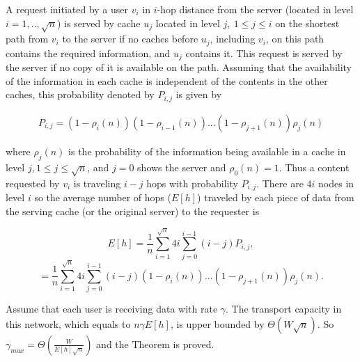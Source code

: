 \documentclass[journal]{IEEEtran}
\theoremstyle{plain}
\theoremstyle{remark}
\begin{document}
\begin{IEEEproof}
A request initiated by a user $v_i$ in $i$-hop distance from the server (located in level $i=1,..,\sqrt{n}$) is served by cache $u_j$ located in level $j,\ 1\leq j\leq i$ on the shortest path from $v_i$ to the server if no caches before $u_j$, including $v_i$, on this path contains the required information, and $u_j$ contains it. This request is served by the server if no copy of it is available on the path. Assuming that the availability of the information in each cache is independent of the contents in the other caches, this probability denoted by $P_{i,j}$ is given by

\begin{eqnarray}
P_{i,j}=(1-\rho_i(n))(1-\rho_{i-1}(n))...(1-\rho_{j+1}(n))\rho_j(n)
\end{eqnarray}

where $\rho_j(n)$ is the probability of the information being available in a cache in level $j, 1 \leq j \leq \sqrt{n}$, and $j=0$ shows the server and $\rho_0(n)=1$. Thus a content requested by $v_i$ is traveling $i-j$ hops with probability $P_{i,j}$. There are $4i$ nodes in level $i$ so the average number of hops ($E[h]$) traveled by each piece of data from the serving cache (or the original server) to the requester is

\begin{equation}
E[h]=\frac{1}{n}\sum_{i=1}^{\sqrt{n}} 4i \sum_{j=0}^{i-1} (i-j)P_{i,j}, \nonumber 
\end{equation}
\begin{equation}
=\frac{1}{n}\sum_{i=1}^{\sqrt{n}} 4i \sum_{j=0}^{i-1} (i-j)(1-\rho_i(n))...(1-\rho_{j+1}(n))\rho_j(n).  \label{eq:barh} 
\end{equation}

Assume that each user is receiving data with rate $\gamma$. The transport capacity in this network, which equals to $n\gamma E[h]$, is upper bounded by $\Theta(W\sqrt{n})$. So $\gamma_{max}=\Theta(\frac{W}{E[h]\sqrt{n}})$ and the Theorem is proved.
\end{IEEEproof}
\end{document}
